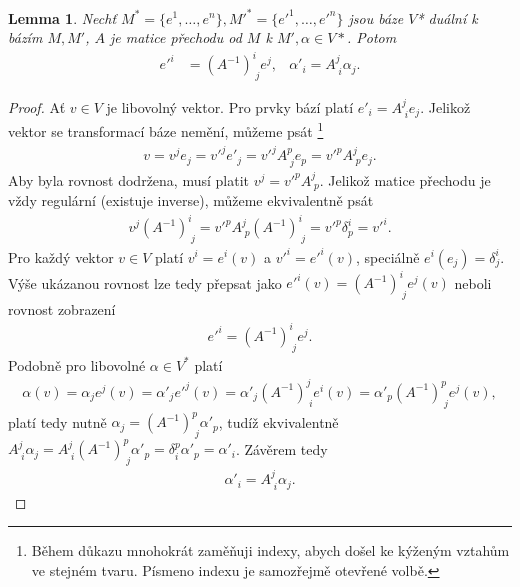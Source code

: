 \documentclass[a4paper,11pt]{report}
\theoremstyle{theorem}
\newtheorem{lemma}[theorem]{Lemma}
\theoremstyle{remark}
\theoremstyle{definition}
\begin{document}
			\begin{lemma}
				Nechť $M^* = \{e^1, \dots, e^n\}, M'^* = \{e'^1, \dots, e'^n\}$ jsou báze $V$* duální k bázím $M, M'$, $A$ je matice přechodu od $M$ k $M', \alpha \in V*$. Potom
				\begin{align}
					e'^i &= (A^{-1})^i_{\; j} e^j, & \alpha'_i = A^j_{\; i} \alpha_j.
				\end{align}
			\end{lemma}
			\begin{proof}
				Ať $v\in V$ je libovolný vektor. Pro prvky bází platí $e'_i = A^j_{\; i} e_j$. Jelikož vektor se transformací báze nemění, můžeme psát%
					\footnote{Během důkazu mnohokrát zaměňuji indexy, abych došel ke kýženým vztahům ve stejném tvaru. Písmeno indexu je samozřejmě otevřené volbě.}
				\begin{align*}
					v = v^j e_j = v'^j e'_j = v'^j A^p_{\; j} e_p = v'^p A^j_{\; p} e_j.
				\end{align*}
				Aby byla rovnost dodržena, musí platit $v^j = v'^p A^j_{\; p}$. Jelikož matice přechodu je vždy regulární (existuje inverse), můžeme ekvivalentně psát
				\begin{align*}
					v^j (A^{-1})^i_{\; j} = v'^p A^j_{\; p} (A^{-1})^i_{\; j} = v'^p \delta^i_p = v'^i.
				\end{align*}
				Pro každý vektor $v \in V$ platí $v^i = e^i(v)$ a $v'^i = e'^i(v)$, speciálně $e^i(e_j) = \delta^i_j$. Výše ukázanou rovnost lze tedy přepsat jako $e'^i(v) = (A^{-1})^i_{\; j} e^j(v)$ neboli rovnost zobrazení
				\begin{align*}
					e'^i = (A^{-1})^i_{\; j} e^j.
				\end{align*}
				Podobně pro libovolné $\alpha \in V^*$ platí
				\begin{align*}
					\alpha(v) = \alpha_j e^j(v) = \alpha'_j e'^j(v) = \alpha'_j (A^{-1})^j_{\; i} e^i(v) = \alpha'_p (A^{-1})^p_{\; j} e^j(v),
				\end{align*}
				platí tedy nutně $\alpha_j = (A^{-1})^p_{\; j} \alpha'_p$, tudíž ekvivalentně $A^j_{\; i} \alpha_j = A^j_{\; i} (A^{-1})^p_{\; j} \alpha'_p = \delta^p_i \alpha'_p = \alpha'_i$. Závěrem tedy
				\begin{align*}
					\alpha'_i = A^j_{\; i} \alpha_j.
				\end{align*}
			\end{proof}
			
\end{document}
